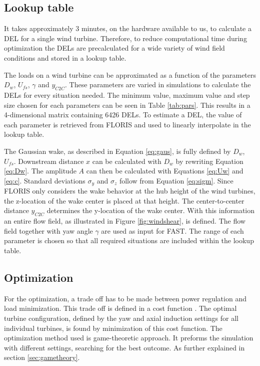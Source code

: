\subsection{Lookup table} \label{sec:lut}
It takes approximately 3 minutes, on the hardware available to us, to calculate a DEL for a single wind turbine. Therefore, to reduce computational time during optimization the DELs are precalculated for a wide variety of wind field conditions and stored in a lookup table.

The loads on a wind turbine can be approximated as a function of the parameters $D_w$, $U_{fs}$, $\gamma$ and $y_{C2C}$. These parameters are varied in simulations to calculate the DELs for every situation needed. The minimum value, maximum value and step size chosen for each parameters can be seen in Table \ref{tab:pars}. This results in a 4-dimensional matrix containing 6426 DELs. To estimate a DEL, the value of each parameter is retrieved from FLORIS and used to linearly interpolate in the lookup table.

The Gaussian wake, as described in Equation \ref{eq:gaus}, is fully defined by $D_w$, $U_{fs}$. Downstream distance $x$ can be calculated with $D_w$ by rewriting Equation \ref{eq:Dw}. The amplitude $A$ can then be calculated with Equations \ref{eq:Uw} and \ref{eq:c}. Standard deviations $\sigma_y$ and $\sigma_z$ follow from Equation \ref{eq:sigm}. Since FLORIS only considers the wake behavior at the hub height of the wind turbines, the z-location of the wake center is placed at that height. The center-to-center distance $y_{C2C}$ determines the y-location of the wake center. With this information an entire flow field, as illustrated in Figure \ref{fig:windshear}, is defined. The flow field together with yaw angle $\gamma$ are used as input for FAST. The range of each parameter is chosen so that all required situations are included within the lookup table.

\subsection{Optimization} \label{sec:optimization}
For the optimization, a trade off has to be made between power regulation and load minimization. This trade off is defined in a cost function \cite{Marden2013}\cite{Dijk2016}. The optimal turbine configuration, defined by the yaw and axial induction settings for all individual turbines, is found by minimization of this cost function. The optimization method used is game-theoretic approach\cite{Marden2013}. It preforms the simulation with different settings, searching for the best outcome. As further explained in section \ref{sec:gametheory}. 
 

